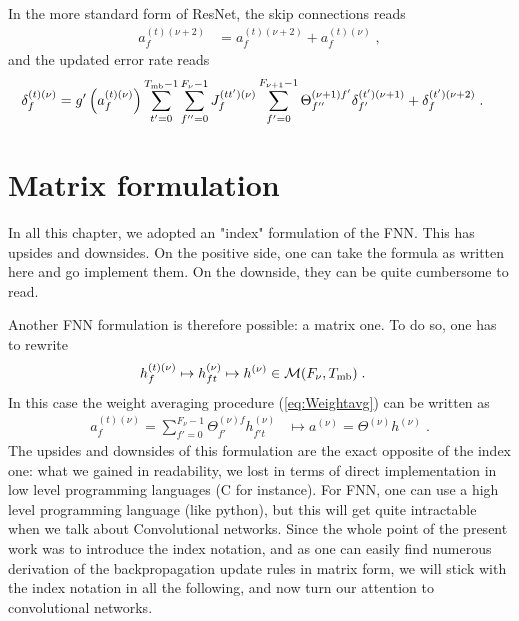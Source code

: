 \begin{subappendices}
In the more standard form of ResNet, the skip connections reads
\begin{align}
 a_{f}^{(t)(\nu+2)}&= a_{f}^{(t)(\nu+2)}+ a_{f}^{(t)(\nu)}\;,
\end{align}
and the updated error rate reads
\begin{align}
\delta^{(t)(\nu)}_f&=g'\left(a_{f}^{(t)(\nu)}\right)
%
\sum_{t'=0}^{T_{{\rm mb}}-1}\sum^{F_{\nu}-1}_{f''=0}J^{(tt')(\nu)}_{f}
%
\sum_{f'=0}^{F_{\nu+1}-1}\Theta^{(\nu+1)f'}_{f''}\delta^{(t')(\nu+1)}_{f'}+\delta^{(t')(\nu+2)}_{f}\;.
\end{align}


\section{Matrix formulation}

In all this chapter, we adopted an "index" formulation of the FNN. This has upsides and downsides. On the positive side, one can take the formula as written here and go implement them. On the downside, they can be quite cumbersome to read.

\vspace{0.2cm}

Another FNN formulation is therefore possible: a matrix one. To do so, one has to rewrite
\begin{align}
h_f^{(t)(\nu)}\mapsto h^{(\nu)}_{ft}&\mapsto h^{(\nu)}\in \mathcal{M}(F_\nu,T_{\rm mb})\;.
\end{align}
In this case the weight averaging procedure (\ref{eq:Weightavg}) can be written as
\begin{align}
a_f^{(t)(\nu)}=\sum_{f'=0}^{F_\nu-1}\Theta^{(\nu)f}_{f'}h^{(\nu)}_{f't}&\mapsto a^{(\nu)}=\Theta^{(\nu)}h^{(\nu)}\;.
\end{align}
The upsides and downsides of this formulation are the exact opposite of the index one: what we gained in readability, we lost in terms of direct implementation in low level programming languages (C for instance). For FNN, one can use a high level programming language (like python), but this will get quite intractable when we talk about Convolutional networks. Since the whole point of the present work was to introduce the index notation, and as one can easily find numerous derivation of the backpropagation update rules in matrix form, we will stick with the index notation in all the following, and now turn our attention to convolutional networks.
\end{subappendices}
